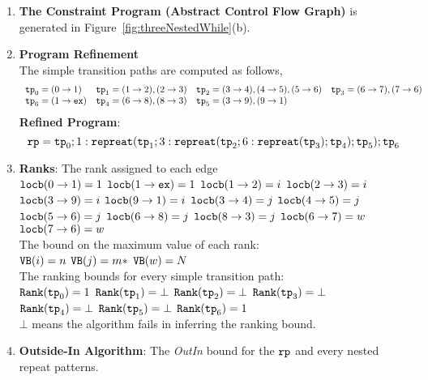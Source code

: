 \begin{enumerate}
  \item  \textbf{The Constraint Program (Abstract Control Flow Graph)} is generated in Figure~\ref{fig:threeNestedWhile}(b).

  \item \textbf{Program Refinement}
  \\
  The simple transition paths are computed as follows,
  \[
      \begin{array}{llll}
          \mathtt{tp}_0 = (0 \to 1)
          &
          \mathtt{tp}_1 = (1 \to 2), (2 \to 3)
          &           
          \mathtt{tp}_2 = (3 \to 4), (4 \to 5), (5 \to 6)
          &
          \mathtt{tp}_3 = (6 \to 7), (7 \to 6)
          \\
          \mathtt{tp}_6 = (1 \to \mathtt{ex})
          &
          \mathtt{tp}_4 = (6 \to 8), (8 \to 3)
          &
          \mathtt{tp}_5 = (3 \to 9), (9 \to 1)
      \end{array}
      \]
  \textbf{Refined Program}:
  \[
  \mathtt{rp} = \mathtt{tp}_0 ; 1: \mathtt{repreat}(\mathtt{tp}_1; 3: \mathtt{repreat}(\mathtt{tp}_2; 6 : \mathtt{repreat}(\mathtt{tp}_3); \mathtt{tp}_4); \mathtt{tp}_5); \mathtt{tp}_6
  \]
  \item \textbf{Ranks}:
  The rank assigned to each edge
  \\  $\mathtt{locb}(0 \to 1) = 1$ \quad
      $\mathtt{locb}(1 \to \mathtt{ex}) = 1$ \quad $\mathtt{locb}(1 \to 2) = i$ \quad $\mathtt{locb}(2 \to 3) = i$ 
      \quad $\mathtt{locb}(3 \to 9) = i$ 
      \quad $\mathtt{locb}(9 \to 1) = i$ 
      \quad $\mathtt{locb}(3 \to 4) = j$ \quad $\mathtt{locb}(4 \to 5) = j$ 
      \quad $\mathtt{locb}(5 \to 6) = j$ 
      \quad $\mathtt{locb}(6 \to 8) = j$ 
      \quad $\mathtt{locb}(8 \to 3) = j$ 
      \quad $\mathtt{locb}(6 \to 7) = w$ 
      \quad $\mathtt{locb}(7 \to 6) = w$ 
  \\
  The bound on the maximum value of each rank:
  \\
  ${\mathtt{VB}}(i) = n$  \quad
  ${\mathtt{VB}}(j) = m * $  \quad
  ${\mathtt{VB}}(w) = N$ 
  \\
  The ranking bounds for every simple transition path:
  \\
  ${\mathtt{Rank}}(\mathtt{tp}_0) = 1$ \quad
  ${\mathtt{Rank}}(\mathtt{tp}_1) = \bot $ \quad
  ${\mathtt{Rank}}(\mathtt{tp}_2) = \bot $ \quad
  ${\mathtt{Rank}}(\mathtt{tp}_3) = \bot $
  \\
  ${\mathtt{Rank}}(\mathtt{tp}_4) = \bot $ \quad
  ${\mathtt{Rank}}(\mathtt{tp}_5) = \bot $ \quad
  ${\mathtt{Rank}}(\mathtt{tp}_6) = 1$ 
  \\
  $\bot$ means the algorithm fails in inferring the ranking bound.
  \item \textbf{Outside-In Algorithm}: The \emph{OutIn} bound for the $\mathtt{rp}$ and every nested repeat patterns.

\end{enumerate}
